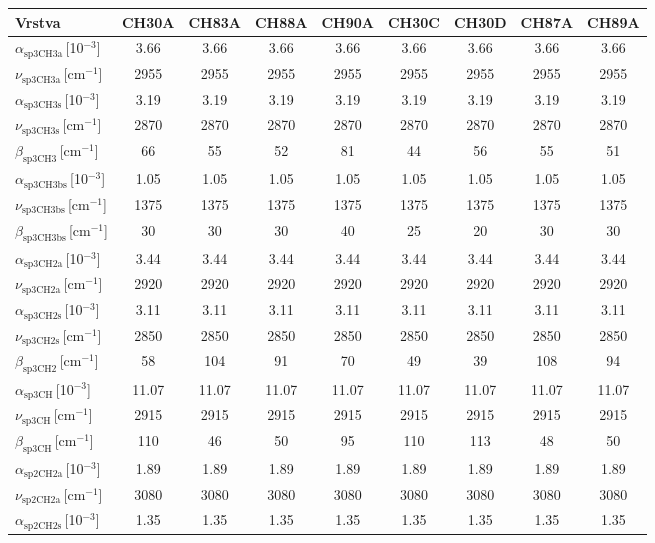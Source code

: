 \begin{tabular}{lcccccccc}
\hline
Vrstva & CH30A & CH83A & CH88A & CH90A & CH30C & CH30D & CH87A & CH89A\\
\hline\hline
$\alpha_\mathrm{sp3CH3a}$\,[10$^{-3}$] & 3.66 & 3.66 & 3.66 & 3.66 & 3.66 & 3.66 & 3.66 & 3.66\\
$\nu_\mathrm{sp3CH3a}$\,[cm$^{-1}$] & 2955 & 2955 & 2955 & 2955 & 2955 & 2955 & 2955 & 2955\\
$\alpha_\mathrm{sp3CH3s}$\,[10$^{-3}$] & 3.19 & 3.19 & 3.19 & 3.19 & 3.19 & 3.19 & 3.19 & 3.19\\
$\nu_\mathrm{sp3CH3s}$\,[cm$^{-1}$] & 2870 & 2870 & 2870 & 2870 & 2870 & 2870 & 2870 & 2870\\
$\beta_\mathrm{sp3CH3}$\,[cm$^{-1}$] & 66 & 55 & 52 & 81 & 44 & 56 & 55 & 51\\
$\alpha_\mathrm{sp3CH3bs}$\,[10$^{-3}$] & 1.05 & 1.05 & 1.05 & 1.05 & 1.05 & 1.05 & 1.05 & 1.05\\
$\nu_\mathrm{sp3CH3bs}$\,[cm$^{-1}$] & 1375 & 1375 & 1375 & 1375 & 1375 & 1375 & 1375 & 1375\\
$\beta_\mathrm{sp3CH3bs}$\,[cm$^{-1}$] & 30 & 30 & 30 & 40 & 25 & 20 & 30 & 30\\
$\alpha_\mathrm{sp3CH2a}$\,[10$^{-3}$]& 3.44 & 3.44 & 3.44 & 3.44 & 3.44 & 3.44 & 3.44 & 3.44\\
$\nu_\mathrm{sp3CH2a}$\,[cm$^{-1}$] & 2920 & 2920 & 2920 & 2920 & 2920 & 2920 & 2920 & 2920\\
$\alpha_\mathrm{sp3CH2s}$\,[10$^{-3}$] & 3.11 & 3.11 & 3.11 & 3.11 & 3.11 & 3.11 & 3.11 & 3.11\\
$\nu_\mathrm{sp3CH2s}$\,[cm$^{-1}$] & 2850 & 2850 & 2850 & 2850 & 2850 & 2850 & 2850 & 2850\\
$\beta_\mathrm{sp3CH2}$\,[cm$^{-1}$] & 58 & 104 & 91 & 70 & 49 & 39 & 108 & 94\\
$\alpha_\mathrm{sp3CH}$\,[10$^{-3}$] & 11.07 & 11.07 & 11.07 & 11.07 & 11.07 & 11.07 & 11.07 & 11.07\\
$\nu_\mathrm{sp3CH}$\,[cm$^{-1}$] & 2915 & 2915 & 2915 & 2915 & 2915 & 2915 & 2915 & 2915\\
$\beta_\mathrm{sp3CH}$\,[cm$^{-1}$] & 110 & 46 & 50 & 95 & 110 & 113 & 48 & 50\\
$\alpha_\mathrm{sp2CH2a}$\,[10$^{-3}$] & 1.89 & 1.89 & 1.89 & 1.89 & 1.89 & 1.89 & 1.89 & 1.89\\
$\nu_\mathrm{sp2CH2a}$\,[cm$^{-1}$] & 3080 & 3080 & 3080 & 3080 & 3080 & 3080 & 3080 & 3080\\
$\alpha_\mathrm{sp2CH2s}$\,[10$^{-3}$] & 1.35 & 1.35 & 1.35 & 1.35 & 1.35 & 1.35 & 1.35 & 1.35\\

\end{tabular}
